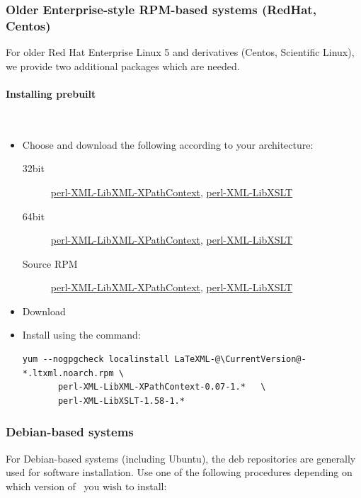 \documentclass{article}
\begin{document}
\subsubsection[Older Enterprise systems]{Older Enterprise-style RPM-based systems (RedHat, Centos)}\label{install.enterprise}
For older Red Hat Enterprise Linux 5 and derivatives (Centos, Scientific Linux),
we provide two additional packages which are needed.

\paragraph{Installing prebuilt}\\
\begin{itemize}
\item Choose and download the following according to your architecture:
\begin{description}
\item[32bit]
   \href{releases/perl-XML-LibXML-XPathContext-0.07-1.c5.ltxml.i386.rpm}{perl-XML-LibXML-XPathContext},
   \href{releases/perl-XML-LibXSLT-1.58-1.c5.ltxml.i386.rpm}{perl-XML-LibXSLT}
\item[64bit]
   \href{releases/perl-XML-LibXML-XPathContext-0.07-1.c5.ltxml.x86_64.rpm}{perl-XML-LibXML-XPathContext},
   \href{releases/perl-XML-LibXSLT-1.58-1.c5.ltxml.x86_64.rpm}{perl-XML-LibXSLT}
\item[Source RPM]
    \href{releases/perl-XML-LibXML-XPathContext-0.07-1.c5.ltxml.src.rpm}{perl-XML-LibXML-XPathContext},
    \href{releases/perl-XML-LibXSLT-1.58-1.c5.ltxml.src.rpm}{perl-XML-LibXSLT}
\end{description}
\item Download \CurrentCentos
\item Install using the command:
\begin{lstlisting}[style=shell]
   yum --nogpgcheck localinstall LaTeXML-@\CurrentVersion@-*.ltxml.noarch.rpm \
       perl-XML-LibXML-XPathContext-0.07-1.*   \
       perl-XML-LibXSLT-1.58-1.*
\end{lstlisting}
\end{itemize}

\subsubsection{Debian-based systems}\label{install.debian}
For Debian-based systems (including Ubuntu), the deb repositories
are generally used for software installation.
Use one of the following procedures depending on which version
of \LaTeXML\ you wish to install:
\end{document}
